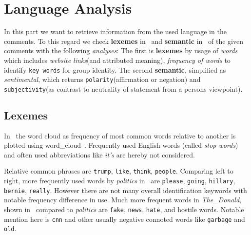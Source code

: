 \documentclass[runningheads,a4paper]{llncs}
\begin{document}
	\section{Language Analysis}
	In this part we want to retrieve information from the used language in the comments.
	To this regard we check \textbf{lexemes} in~ and \textbf{semantic} in~ of the given comments with the following \textit{analyses}:
	The first is \textbf{lexemes} by usage of \textit{words} which includes \textit{website links}(and attributed meaning), \textit{frequency of words} to identify \texttt{key words} for group identity.
	The second \textbf{semantic}, simplified as \textit{sentimental}, which returns \texttt{polarity}(affirmation or negation) and \texttt{subjectivity}(as contrast to neutrality of statement from a persons viewpoint).
	\subsection{Lexemes}\label{sub:lexemes}

	In~ the word cloud as frequency of most common words relative to another is plotted using word\_cloud~\cite{wordcloud}. Frequently used English words (called \textit{stop words}) and often used abbreviations like \textit{it's} are hereby not considered.\par
	Relative common phrases are \texttt{trump}, \texttt{like}, \texttt{think}, \texttt{people}.
	Comparing left to right, more frequently used words by \textit{politics} in~
	are \texttt{please}, \texttt{going}, \texttt{hillary}, \texttt{bernie}, \texttt{really}. However there are not many overall identification keywords with notable frequency difference in use.
	Much more frequent words in \textit{The\_Donald}, shown in~ compared to \textit{politics} are
	\texttt{fake}, \texttt{news}, \texttt{hate}, and hostile words. Notable mention here is \texttt{cnn} and other usually negative connoted words like \texttt{garbage} and \texttt{old}.\par
\end{document}
